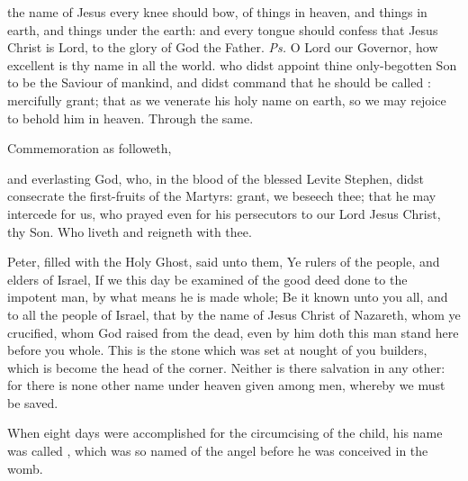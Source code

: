 \introit
{} the name of Jesus every knee should bow, of things in heaven, and things in earth, and things under the earth: and every tongue should confess that Jesus Christ is Lord, to the glory of God the Father. \textit{Ps.} O Lord our Governor, how excellent is thy name in all the world.
\collect
{} who didst appoint thine only-begotten Son to be the Saviour of mankind, and didst command that he should be called : mercifully grant; that as we venerate his holy name on earth, so we may rejoice to behold him in heaven. Through the same.
\begin{rubric}
	Commemoration  as followeth,
\end{rubric}
 and everlasting God, who, in the blood of the blessed Levite Stephen, didst consecrate the first-fruits of the Martyrs: grant, we beseech thee; that he may intercede for us, who prayed even for his persecutors to our Lord Jesus Christ, thy Son. Who liveth and reigneth with thee.

 Peter, filled with the Holy Ghost, said unto them, Ye rulers of the people, and elders of Israel, If we this day be examined of the good deed done to the impotent man, by what means he is made whole; Be it known unto you all, and to all the people of Israel, that by the name of Jesus Christ of Nazareth, whom ye crucified, whom God raised from the dead, even by him doth this man stand here before you whole. This is the stone which was set at nought of you builders, which is become the head of the corner. Neither is there salvation in any other: for there is none other name under heaven given among men, whereby we must be saved.


 When eight days were accomplished for the circumcising of the child, his name was called , which was so named of the angel before he was conceived in the womb.

